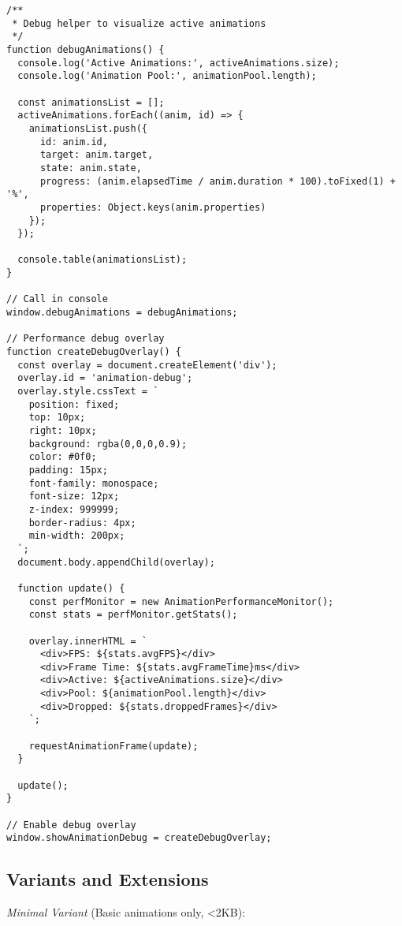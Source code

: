 \documentclass[11pt]{article}
\begin{document}
\begin{verbatim}
/**
 * Debug helper to visualize active animations
 */
function debugAnimations() {
  console.log('Active Animations:', activeAnimations.size);
  console.log('Animation Pool:', animationPool.length);
  
  const animationsList = [];
  activeAnimations.forEach((anim, id) => {
    animationsList.push({
      id: anim.id,
      target: anim.target,
      state: anim.state,
      progress: (anim.elapsedTime / anim.duration * 100).toFixed(1) + '%',
      properties: Object.keys(anim.properties)
    });
  });
  
  console.table(animationsList);
}

// Call in console
window.debugAnimations = debugAnimations;

// Performance debug overlay
function createDebugOverlay() {
  const overlay = document.createElement('div');
  overlay.id = 'animation-debug';
  overlay.style.cssText = `
    position: fixed;
    top: 10px;
    right: 10px;
    background: rgba(0,0,0,0.9);
    color: #0f0;
    padding: 15px;
    font-family: monospace;
    font-size: 12px;
    z-index: 999999;
    border-radius: 4px;
    min-width: 200px;
  `;
  document.body.appendChild(overlay);
  
  function update() {
    const perfMonitor = new AnimationPerformanceMonitor();
    const stats = perfMonitor.getStats();
    
    overlay.innerHTML = `
      <div>FPS: ${stats.avgFPS}</div>
      <div>Frame Time: ${stats.avgFrameTime}ms</div>
      <div>Active: ${activeAnimations.size}</div>
      <div>Pool: ${animationPool.length}</div>
      <div>Dropped: ${stats.droppedFrames}</div>
    `;
    
    requestAnimationFrame(update);
  }
  
  update();
}

// Enable debug overlay
window.showAnimationDebug = createDebugOverlay;
\end{verbatim}
\subsection{Variants and Extensions}
\label{sec:orgee4120d}

\emph{Minimal Variant} (Basic animations only, <2KB):
\end{document}
